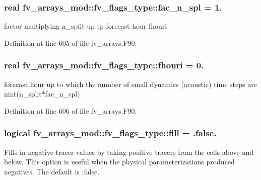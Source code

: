 \subsubsection[{fac\-\_\-n\-\_\-spl}]{\setlength{\rightskip}{0pt plus 5cm}real fv\-\_\-arrays\-\_\-mod\-::fv\-\_\-flags\-\_\-type\-::fac\-\_\-n\-\_\-spl = 1.}\label{structfv__arrays__mod_1_1fv__flags__type_a1fc8fecf8287bd8afbc67f8b07bace74}


factor multiplying n\-\_\-split up tp forecast hour fhouri 



Definition at line 605 of file fv\-\_\-arrays.\-F90.

\subsubsection[{fhouri}]{\setlength{\rightskip}{0pt plus 5cm}real fv\-\_\-arrays\-\_\-mod\-::fv\-\_\-flags\-\_\-type\-::fhouri = 0.}\label{structfv__arrays__mod_1_1fv__flags__type_ac715c1c5c6fef1874fdc63eead44474a}


forecast hour up to which the number of small dynamics (acoustic) time steps are nint(n\-\_\-split$\ast$fac\-\_\-n\-\_\-spl) 



Definition at line 606 of file fv\-\_\-arrays.\-F90.

\subsubsection[{fill}]{\setlength{\rightskip}{0pt plus 5cm}logical fv\-\_\-arrays\-\_\-mod\-::fv\-\_\-flags\-\_\-type\-::fill = .false.}\label{structfv__arrays__mod_1_1fv__flags__type_abc28981ee78d98024ddf466784f575b6}


Fills in negative tracer values by taking positive tracers from the cells above and below. This option is useful when the physical parameterizations produced negatives. The default is .false. 



